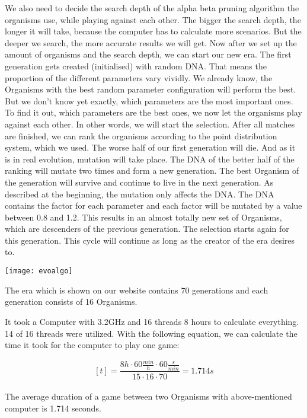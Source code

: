 We also need to decide the search depth of the alpha beta pruning algorithm the organisms use, while playing against each other. The bigger the search depth, the longer it will take, because the computer has to calculate more scenarios. But the deeper we search, the more accurate results we will get. 
Now after we set up the amount of organisms and the search depth, we can start our new era. The first generation gets created (initialised) with random DNA. %
That means the proportion of the different parameters vary vividly. We already know, the Organisms with the best random parameter configuration will perform the best. But we don't know yet exactly, which parameters are the most important ones. To find it out, which parameters are the best ones, we now let the organisms play against each other. In other words, we will start the selection. After all matches are finished, we can rank the organisms according to the point distribution system, which we used. The worse half of our first generation will die. And as it is in real evolution, mutation will take place.
The DNA of the better half of the ranking will mutate two times and form a new generation. The best Organism of the generation will survive and continue to live in the next generation.
As described at the beginning, the mutation only affects the DNA. The DNA contains the factor for each parameter and each factor will be mutated by a value between 0.8 and 1.2. This results in an almost totally new set of Organisms, which are descenders of the previous generation. The selection starts again for this generation.
This cycle will continue as long as the creator of the era desires to. \\

\begin{fixedpic}
	\centering
	\texttt{[image: evoalgo]}
\end{fixedpic}


The era which is shown on our website contains 70 generations and each generation consists of 16 Organisms.

It took a Computer with 3.2GHz and 16 threads 8 hours to calculate everything. 14 of 16 threads were utilized. With the following equation, we can calculate the time it took for the computer to play one game:

$$ [t] =  \frac{8h \cdot 60\frac{min}{h} \cdot 60\frac{s}{min}}{15 \cdot 16 \cdot 70} = 1.714s$$\\
The average duration of a game between two Organisms with above-mentioned computer is 1.714 seconds.

